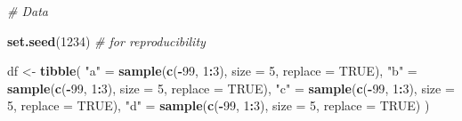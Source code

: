 \documentclass[
]{book}
\newenvironment{Shaded}{\begin{snugshade}}{\end{snugshade}}
\newcommand{\CommentTok}[1]{\textcolor[rgb]{0.56,0.35,0.01}{\textit{#1}}}
\newcommand{\DataTypeTok}[1]{\textcolor[rgb]{0.13,0.29,0.53}{#1}}
\newcommand{\DecValTok}[1]{\textcolor[rgb]{0.00,0.00,0.81}{#1}}
\newcommand{\KeywordTok}[1]{\textcolor[rgb]{0.13,0.29,0.53}{\textbf{#1}}}
\newcommand{\NormalTok}[1]{#1}
\newcommand{\OperatorTok}[1]{\textcolor[rgb]{0.81,0.36,0.00}{\textbf{#1}}}
\newcommand{\OtherTok}[1]{\textcolor[rgb]{0.56,0.35,0.01}{#1}}
\newcommand{\StringTok}[1]{\textcolor[rgb]{0.31,0.60,0.02}{#1}}
\begin{document}
\begin{Shaded}
\begin{Highlighting}[]
\CommentTok{\# Data}

\KeywordTok{set.seed}\NormalTok{(}\DecValTok{1234}\NormalTok{) }\CommentTok{\# for reproducibility}

\NormalTok{df \textless{}{-}}\StringTok{ }\KeywordTok{tibble}\NormalTok{(}
  \StringTok{"a"}\NormalTok{ =}\StringTok{ }\KeywordTok{sample}\NormalTok{(}\KeywordTok{c}\NormalTok{(}\OperatorTok{{-}}\DecValTok{99}\NormalTok{, }\DecValTok{1}\OperatorTok{:}\DecValTok{3}\NormalTok{), }\DataTypeTok{size =} \DecValTok{5}\NormalTok{, }\DataTypeTok{replace =} \OtherTok{TRUE}\NormalTok{),}
  \StringTok{"b"}\NormalTok{ =}\StringTok{ }\KeywordTok{sample}\NormalTok{(}\KeywordTok{c}\NormalTok{(}\OperatorTok{{-}}\DecValTok{99}\NormalTok{, }\DecValTok{1}\OperatorTok{:}\DecValTok{3}\NormalTok{), }\DataTypeTok{size =} \DecValTok{5}\NormalTok{, }\DataTypeTok{replace =} \OtherTok{TRUE}\NormalTok{),}
  \StringTok{"c"}\NormalTok{ =}\StringTok{ }\KeywordTok{sample}\NormalTok{(}\KeywordTok{c}\NormalTok{(}\OperatorTok{{-}}\DecValTok{99}\NormalTok{, }\DecValTok{1}\OperatorTok{:}\DecValTok{3}\NormalTok{), }\DataTypeTok{size =} \DecValTok{5}\NormalTok{, }\DataTypeTok{replace =} \OtherTok{TRUE}\NormalTok{),}
  \StringTok{"d"}\NormalTok{ =}\StringTok{ }\KeywordTok{sample}\NormalTok{(}\KeywordTok{c}\NormalTok{(}\OperatorTok{{-}}\DecValTok{99}\NormalTok{, }\DecValTok{1}\OperatorTok{:}\DecValTok{3}\NormalTok{), }\DataTypeTok{size =} \DecValTok{5}\NormalTok{, }\DataTypeTok{replace =} \OtherTok{TRUE}\NormalTok{)}
\NormalTok{)}
\end{Highlighting}
\end{Shaded}

\begin{Shaded}
\end{Shaded}
\end{document}
